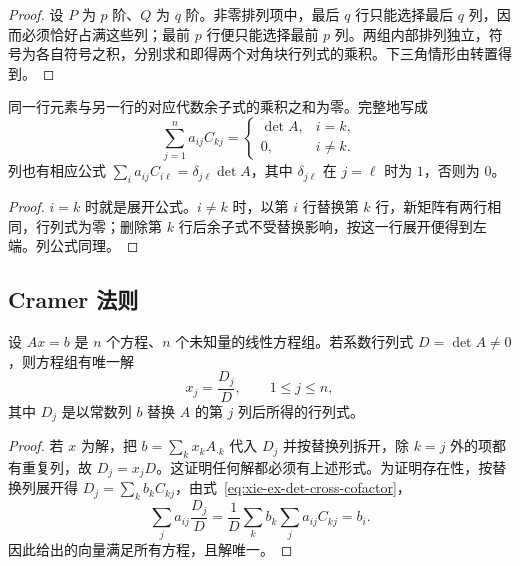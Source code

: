 \begin{proof}
设 $P$ 为 $p$ 阶、$Q$ 为 $q$ 阶。非零排列项中，最后 $q$ 行只能选择最后 $q$ 列，因而必须恰好占满这些列；最前 $p$ 行便只能选择最前 $p$ 列。两组内部排列独立，符号为各自符号之积，分别求和即得两个对角块行列式的乘积。下三角情形由转置得到。
\end{proof}

\begin{proposition}
\label{prop:xie-ex-det-cross-cofactor}
同一行元素与另一行的对应代数余子式的乘积之和为零。完整地写成
\begin{equation}
\label{eq:xie-ex-det-cross-cofactor}
\sum_{j=1}^{n}a_{ij}C_{kj}
=\begin{cases}\det A,&i=k,\\0,&i\ne k.\end{cases}
\end{equation}
列也有相应公式 $\sum_i a_{ij}C_{i\ell}=\delta_{j\ell}\det A$，其中 $\delta_{j\ell}$ 在 $j=\ell$ 时为 $1$，否则为 $0$。
\end{proposition}

\begin{proof}
$i=k$ 时就是展开公式。$i\ne k$ 时，以第 $i$ 行替换第 $k$ 行，新矩阵有两行相同，行列式为零；删除第 $k$ 行后余子式不受替换影响，按这一行展开便得到左端。列公式同理。
\end{proof}

\subsection{Cramer 法则}

\begin{theorem}[Cramer 法则]
\label{thm:xie-ex-det-cramer}
设 $Ax=b$ 是 $n$ 个方程、$n$ 个未知量的线性方程组。若系数行列式 $D=\det A\ne0$，则方程组有唯一解
\begin{equation}
\label{eq:xie-ex-det-cramer}
x_j=\frac{D_j}{D},\qquad 1\leq j\leq n,
\end{equation}
其中 $D_j$ 是以常数列 $b$ 替换 $A$ 的第 $j$ 列后所得的行列式。
\end{theorem}

\begin{proof}
若 $x$ 为解，把 $b=\sum_k x_kA_{\cdot k}$ 代入 $D_j$ 并按替换列拆开，除 $k=j$ 外的项都有重复列，故 $D_j=x_jD$。这证明任何解都必须有上述形式。为证明存在性，按替换列展开得 $D_j=\sum_k b_kC_{kj}$，由式~\eqref{eq:xie-ex-det-cross-cofactor}，
\[
\sum_j a_{ij}\frac{D_j}{D}
=\frac1D\sum_k b_k\sum_j a_{ij}C_{kj}=b_i.
\]
因此给出的向量满足所有方程，且解唯一。
\end{proof}

